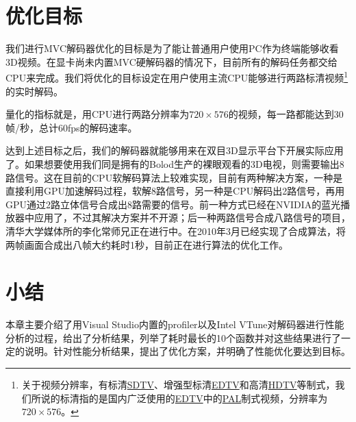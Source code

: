 \section{优化目标}
\label{sec:optaim}

我们进行MVC解码器优化的目标是为了能让普通用户使用PC作为终端能够收看3D视频。在显卡尚未内置MVC硬解码器的情况下，目前所有的解码任务都交给CPU来完成。我们将优化的目标设定在用户使用主流CPU能够进行两路标清视频\footnote{关于视频分辨率，有标清\href{http://en.wikipedia.org/wiki/Standard-definition_television}{SDTV}、增强型标清\href{http://en.wikipedia.org/wiki/Enhanced-definition_television}{EDTV}和高清\href{http://en.wikipedia.org/wiki/High-definition_television}{HDTV}等制式，我们所说的标清指的是国内广泛使用的\href{http://en.wikipedia.org/wiki/Enhanced-definition_television}{EDTV}中的\href{http://en.wikipedia.org/wiki/Phase_Alternating_Line}{PAL}制式视频，分辨率为$720\times576$。}的实时解码。

量化的指标就是，用CPU进行两路分辨率为$720\times576$的视频，每一路都能达到30帧/秒，总计60fps的解码速率。

达到上述目标之后，我们的解码器就能够用来在双目3D显示平台下开展实际应用了。如果想要使用我们同是拥有的Bolod生产的裸眼观看的3D电视，则需要输出8路信号。这在目前的CPU软解码算法上较难实现，目前有两种解决方案，一种是直接利用GPU加速解码过程，软解8路信号，另一种是CPU解码出2路信号，再用GPU通过2路立体信号合成出8路需要的信号。前一种方式已经在NVIDIA的蓝光播放器中应用了，不过其解决方案并不开源；后一种两路信号合成八路信号的项目，清华大学媒体所的李化常师兄正在进行中。在2010年3月已经实现了合成算法，将两帧画面合成出八帧大约耗时1秒，目前正在进行算法的优化工作。

\section{小结}
\label{sec:sum3}
本章主要介绍了用Visual Studio内置的profiler以及Intel VTune对解码器进行性能分析的过程，给出了分析结果，列举了耗时最长的10个函数并对这些结果进行了一定的说明。针对性能分析结果，提出了优化方案，并明确了性能优化要达到目标。

\cleardoublepage